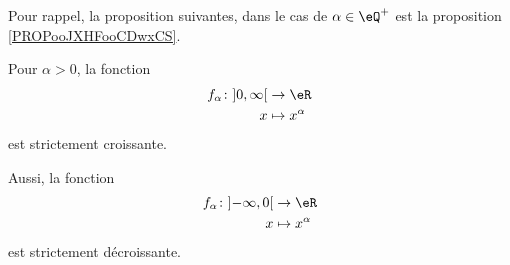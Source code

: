 Pour rappel, la proposition suivantes, dans le cas de \( \alpha\in \eQ^+\) est la proposition \ref{PROPooJXHFooCDwxCS}.
\begin{proposition}      \label{PROPooRXLNooWkPGsO}
    Pour \( \alpha>0\), la fonction
    \begin{equation}
        \begin{aligned}
            f_{\alpha}\colon\mathopen] 0 , \infty \mathclose[&\to \eR \\
                x&\mapsto x^{\alpha} 
        \end{aligned}
    \end{equation}
    est strictement croissante.

    Aussi, la fonction
    \begin{equation}
        \begin{aligned}
        f_{\alpha}\colon  \mathopen] -\infty , 0 \mathclose[  &\to \eR \\
                x&\mapsto x^{\alpha} 
        \end{aligned}
    \end{equation}
    est strictement décroissante.
\end{proposition}

